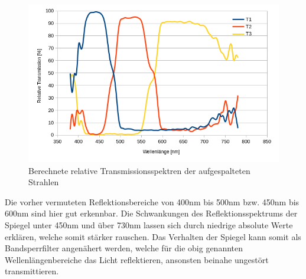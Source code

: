 \begin{figure}[h]
	\centering
	\includegraphics[scale=0.8]{Images/V1_Transmissionen.png}
	\caption{Berechnete relative Transmissionsspektren der aufgespalteten Strahlen}
	\label{V1_REFLECT}
\end{figure}

Die vorher vermuteten Reflektionsbereiche von 400nm bis 500nm bzw. 450nm bis 600nm sind hier gut erkennbar. Die Schwankungen des Reflektionsspektrums der Spiegel unter 450nm und über 730nm lassen sich durch niedrige absolute Werte erklären, welche somit stärker rauschen.
Das Verhalten der Spiegel kann somit als Bandsperrfilter angenähert werden, welche für die obig genannten Wellenlängenbereiche das Licht reflektieren, ansonsten beinahe ungestört transmittieren.